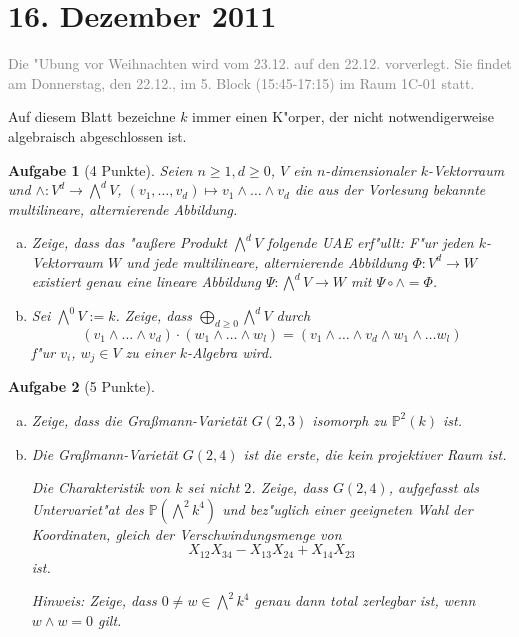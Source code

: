 \documentclass[a4paper, 12pt, numbers=noendperiod, chapterprefix=true, headsepline]{scrbook}
\theoremstyle{break}
\newtheorem{Aufg}{Aufgabe}
\theoremstyle{nonumberbreak}
\theoremstyle{nonumberplain}
\newcommand{\IP}{\mathbb{P}}%
\begin{document}
\newpage
\section{16. Dezember 2011}
\setcounter{Aufg}{0}
\setcounter{Loes}{2}
\textcolor{gray}{Die "Ubung vor Weihnachten wird vom 23.12. auf den 22.12. vorverlegt. Sie findet am Donnerstag, den 22.12., im 5. Block (15:45-17:15) im Raum 1C-01 statt.}

Auf diesem Blatt bezeichne $k$ immer einen K"orper, der nicht notwendigerweise algebraisch abgeschlossen ist.

\begin{Aufg}[4 Punkte]
Seien $n \geq 1, d \geq 0$, $V$ ein $n$-dimensionaler $k$-Vektorraum und $\wedge \colon V^d \to \bigwedge^dV$, $(v_1, \dots, v_d) \mapsto v_1 \wedge \dots \wedge v_d$ die aus der Vorlesung bekannte multilineare, alternierende Abbildung. 
\begin{enumerate}[a)]
	\item Zeige, dass das "au\ss ere Produkt $\bigwedge^dV$ folgende UAE erf"ullt:
	F"ur jeden $k$-Vektorraum $W$ und jede multilineare, alternierende Abbildung $\Phi\colon V^d \to W$ existiert genau eine lineare Abbildung $\Psi \colon \bigwedge^d V \to W$ mit $\Psi \circ \wedge = \Phi$.
	\item Sei $\bigwedge^0 V := k$. Zeige, dass $\bigoplus\limits_{d\geq 0} \bigwedge^d V$ durch 
		\[(v_{1} \wedge \dots \wedge v_{d}) \cdot (w_{1} \wedge \dots \wedge w_l) = (v_1 \wedge \dots \wedge v_d \wedge w_1 \wedge \dots w_l)\]
	f"ur $v_i$, $w_j \in V$ zu einer $k$-Algebra wird.
\end{enumerate}
\end{Aufg}

\begin{Aufg}[5 Punkte]
\begin{enumerate}[a)]
	\item Zeige, dass die Gra\ss mann-Variet\"at $G(2,3)$ isomorph zu $\IP^2(k)$ ist.
	\item Die Gra\ss mann-Variet\"at $G(2,4)$ ist die erste, die kein projektiver Raum ist.

	Die Charakteristik von $k$ sei nicht $2$. Zeige, dass $G(2,4)$, aufgefasst als Untervariet"at des $\IP(\bigwedge^2 k^4)$ und bez"uglich einer geeigneten Wahl der Koordinaten, gleich der Verschwindungsmenge von
		\[X_{12}X_{34} - X_{13}X_{24} + X_{14}X_{23}\]
	ist.
	
	\emph{Hinweis: Zeige, dass $0\neq w\in \bigwedge^2k^4$ genau dann total zerlegbar ist, wenn $w\wedge w = 0$ gilt.}
\end{enumerate}\end{Aufg}
\end{document}
